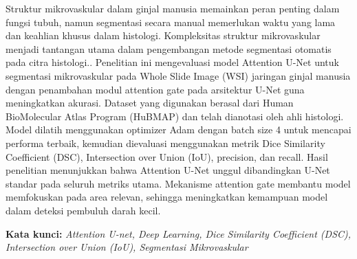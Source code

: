 \begin{abstractind}
\justifying

\noindent Struktur mikrovaskular dalam ginjal manusia memainkan peran penting dalam fungsi tubuh, namun segmentasi secara manual memerlukan waktu yang lama dan keahlian khusus dalam histologi. Kompleksitas struktur mikrovaskular menjadi tantangan utama dalam pengembangan metode segmentasi otomatis pada citra histologi.. Penelitian ini mengevaluasi model Attention U-Net untuk segmentasi mikrovaskular pada Whole Slide Image (WSI) jaringan ginjal manusia dengan penambahan modul attention gate pada arsitektur U-Net guna meningkatkan akurasi. Dataset yang digunakan berasal dari Human BioMolecular Atlas Program (HuBMAP) dan telah dianotasi oleh ahli histologi. Model dilatih menggunakan optimizer Adam dengan batch size 4 untuk mencapai performa terbaik, kemudian dievaluasi menggunakan metrik Dice Similarity Coefficient (DSC), Intersection over Union (IoU), precision, dan recall. Hasil penelitian menunjukkan bahwa Attention U-Net unggul dibandingkan U-Net standar pada seluruh metriks utama. Mekanisme attention gate membantu model memfokuskan pada area relevan, sehingga meningkatkan kemampuan model dalam deteksi pembuluh darah kecil.

\bigskip
\noindent
\textbf{Kata kunci:} \textit{Attention U-net, Deep Learning, Dice Similarity Coefficient (DSC), Intersection over Union (IoU), Segmentasi Mikrovaskular}  %
\end{abstractind}
